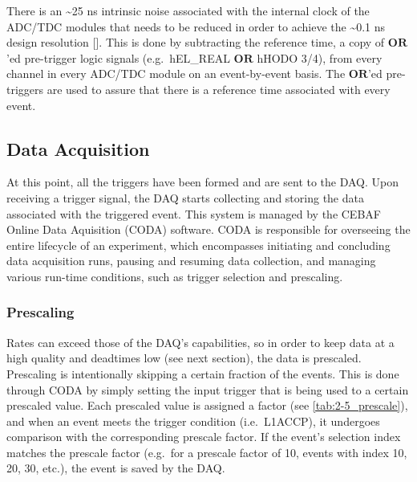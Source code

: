 \documentclass[
]{report}
\begin{document}


There is an \textasciitilde25 ns intrinsic noise associated with the
internal clock of the ADC/TDC modules that needs to be reduced in order
to achieve the \textasciitilde0.1 ns design resolution
{[}\cite{yero_quick_2023}{]}. This is done by subtracting the reference
time, a copy of \(\textbf{OR}\)'ed pre-trigger logic signals
(e.g.~hEL\_REAL \(\textbf{OR}\) hHODO 3/4), from every channel in every
ADC/TDC module on an event-by-event basis. The \(\textbf{OR}\)'ed
pre-triggers are used to assure that there is a reference time
associated with every event.

\hypertarget{data-acquisition}{%
\subsection{Data Acquisition}\label{data-acquisition}}

At this point, all the triggers have been formed and are sent to the
DAQ. Upon receiving a trigger signal, the DAQ starts collecting and
storing the data associated with the triggered event. This system is
managed by the CEBAF Online Data Aquisition (CODA) software. CODA is
responsible for overseeing the entire lifecycle of an experiment, which
encompasses initiating and concluding data acquisition runs, pausing and
resuming data collection, and managing various run-time conditions, such
as trigger selection and prescaling.

\hypertarget{prescaling}{%
\subsubsection{Prescaling}\label{prescaling}}



Rates can exceed those of the DAQ's capabilities, so in order to keep
data at a high quality and deadtimes low (see next section), the data is
prescaled. Prescaling is intentionally skipping a certain fraction of
the events. This is done through CODA by simply setting the input
trigger that is being used to a certain prescaled value. Each prescaled
value is assigned a factor (see \ref{tab:2-5_prescale}), and when an
event meets the trigger condition (i.e.~L1ACCP), it undergoes comparison
with the corresponding prescale factor. If the event's selection index
matches the prescale factor (e.g.~for a prescale factor of 10, events
with index 10, 20, 30, etc.), the event is saved by the DAQ.
\end{document}

